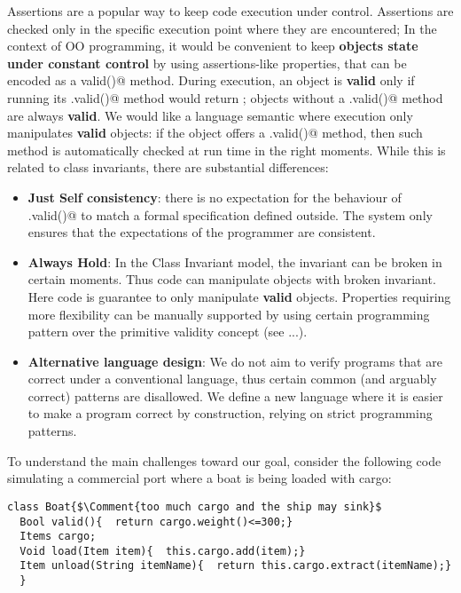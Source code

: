  
Assertions are a popular way to keep code execution
under control. Assertions are checked only in the specific
execution point where they are encountered;
In the context of OO programming, it would be
convenient to keep \textbf{objects state
under constant control} by using assertions-like properties, that
can be encoded as a \Q@Bool valid()@ method.
During execution,
an object is \textbf{valid} only if running its
\Q@.valid()@ method would return \Q@true@;
objects without a \Q@.valid()@ method are always \textbf{valid}.
We would like a language semantic where 
execution only manipulates \textbf{valid} objects:
if the object offers a \Q@.valid()@ method, then such
 method is automatically checked at run time in the right moments.
While this is related to class invariants,
there are substantial differences:
\begin{itemize}
\item \textbf{Just Self consistency}: there is no expectation for
the behaviour of \Q@.valid()@ to match a formal specification defined outside.
The system only ensures that the expectations of the programmer are consistent.
\item \textbf{Always Hold}: 
In the Class Invariant model, the invariant can be broken in
certain moments. Thus code can manipulate objects with broken invariant.
Here code is guarantee to only manipulate \textbf{valid} objects.
Properties requiring more flexibility can be manually supported by
 using certain programming pattern over the primitive validity concept (see ...).
\item \textbf{Alternative language design}:
We do not aim to verify programs that are correct under a conventional language,
thus certain common (and arguably correct) patterns are disallowed.
We define a new language where it is easier to make a program correct by construction, relying on
strict programming patterns.
\end{itemize}

\noindent To understand the main challenges
toward our goal,
consider the following code 
simulating a commercial port
 where a boat is being loaded with cargo:
\saveSpace
\begin{lstlisting}
class Boat{$\Comment{too much cargo and the ship may sink}$
  Bool valid(){  return cargo.weight()<=300;}
  Items cargo;
  Void load(Item item){  this.cargo.add(item);}
  Item unload(String itemName){  return this.cargo.extract(itemName);}
  }
\end{lstlisting}
\saveSpace




